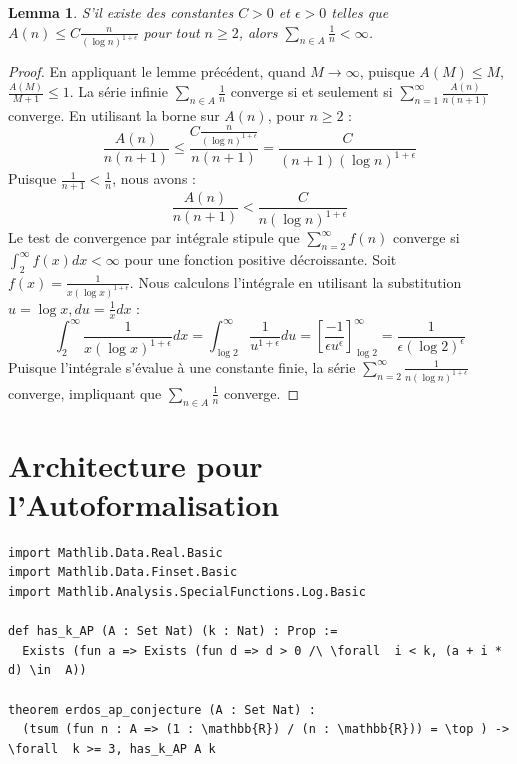 \documentclass[11pt, a4paper]{article}
\newtheorem{lemma}[theorem]{Lemma}
\begin{document}
\begin{lemma}
S'il existe des constantes $C > 0$ et $\epsilon > 0$ telles que $A(n) \le C \frac{n}{(\log n)^{1+\epsilon}}$ pour tout $n \ge 2$, alors $\sum_{n \in A} \frac{1}{n} < \infty$.
\end{lemma}
\begin{proof}
En appliquant le lemme précédent, quand $M \to \infty$, puisque $A(M) \le M$, $\frac{A(M)}{M+1} \le 1$. La série infinie $\sum_{n \in A} \frac{1}{n}$ converge si et seulement si $\sum_{n=1}^\infty \frac{A(n)}{n(n+1)}$ converge. En utilisant la borne sur $A(n)$, pour $n \ge 2$ :
$$ \frac{A(n)}{n(n+1)} \le \frac{C \frac{n}{(\log n)^{1+\epsilon}}}{n(n+1)} = \frac{C}{(n+1)(\log n)^{1+\epsilon}} $$
Puisque $\frac{1}{n+1} < \frac{1}{n}$, nous avons :
$$ \frac{A(n)}{n(n+1)} < \frac{C}{n(\log n)^{1+\epsilon}} $$
Le test de convergence par intégrale stipule que $\sum_{n=2}^\infty f(n)$ converge si $\int_2^\infty f(x)dx < \infty$ pour une fonction positive décroissante. Soit $f(x) = \frac{1}{x(\log x)^{1+\epsilon}}$. Nous calculons l'intégrale en utilisant la substitution $u = \log x, du = \frac{1}{x}dx$ :
$$ \int_2^\infty \frac{1}{x(\log x)^{1+\epsilon}} dx = \int_{\log 2}^\infty \frac{1}{u^{1+\epsilon}} du = \left[ \frac{-1}{\epsilon u^\epsilon} \right]_{\log 2}^\infty = \frac{1}{\epsilon (\log 2)^\epsilon} $$
Puisque l'intégrale s'évalue à une constante finie, la série $\sum_{n=2}^\infty \frac{1}{n(\log n)^{1+\epsilon}}$ converge, impliquant que $\sum_{n \in A} \frac{1}{n}$ converge.
\end{proof}


\section{Architecture pour l'Autoformalisation}
\begin{verbatim}
import Mathlib.Data.Real.Basic
import Mathlib.Data.Finset.Basic
import Mathlib.Analysis.SpecialFunctions.Log.Basic

def has_k_AP (A : Set Nat) (k : Nat) : Prop :=
  Exists (fun a => Exists (fun d => d > 0 /\ \forall  i < k, (a + i * d) \in  A))

theorem erdos_ap_conjecture (A : Set Nat) :
  (tsum (fun n : A => (1 : \mathbb{R}) / (n : \mathbb{R})) = \top ) -> \forall  k >= 3, has_k_AP A k
\end{verbatim}
\end{document}
